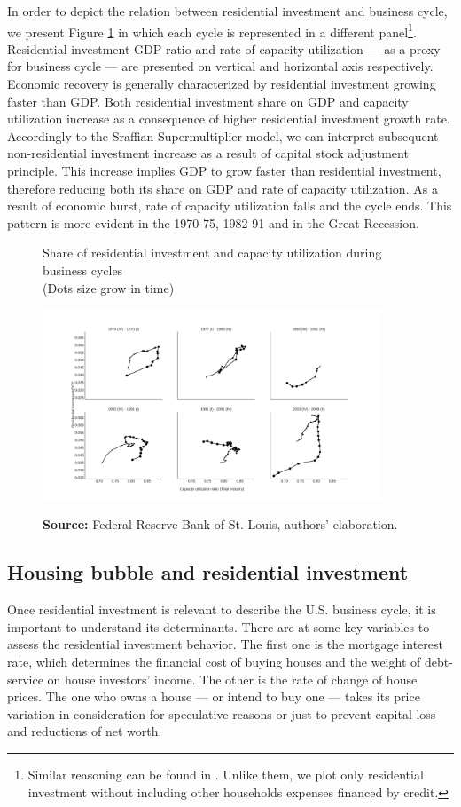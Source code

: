 \documentclass[11pt]{article}
\begin{document}
In order to depict the relation between residential investment and business cycle, we present Figure \ref{fig:cycles} in which each cycle is represented in a different panel\footnote{Similar reasoning can be found in \textcite{fiebiger_trend_2017}. Unlike them, we plot only residential investment without including other households expenses financed by credit.}.
Residential investment-GDP ratio and rate of capacity utilization --- as a proxy for business cycle --- are presented on vertical and horizontal axis respectively.
Economic recovery is generally characterized by residential investment growing faster than GDP. Both residential investment share on GDP and capacity utilization increase as a consequence of higher residential investment growth rate.
Accordingly to the Sraffian Supermultiplier model, we can interpret subsequent non-residential investment increase as a result of capital stock adjustment principle. 
This increase implies GDP to grow faster than residential investment, therefore reducing both its share on GDP and rate of capacity utilization.
As a result of economic burst, rate of capacity utilization falls and the cycle ends.
This pattern is more evident in the 1970-75, 1982-91 and in the Great Recession.


\begin{figure}[htb]
    \centering
        \caption{Share of residential investment and capacity utilization during business cycles\\\centering (Dots size grow in  time)} 
    \includegraphics[width = 0.9\textwidth]{./figs/cycles.png}
    \label{fig:cycles}
    \caption*{\textbf{Source:} Federal Reserve Bank of St. Louis, authors’ elaboration.}
\end{figure}

\subsection{Housing bubble and residential investment}
\label{sec:org8e47bfa}
\label{sec_own}
Once residential investment is relevant to describe the U.S. business cycle, it is important to understand its determinants.
There are at some key variables to assess the residential investment behavior.
The first one is the mortgage interest rate, which determines the financial cost of buying houses and the weight of debt-service on house investors' income.
The other is the rate of change of house prices.
The one who owns a house --- or intend to buy one --- takes its price variation in consideration for speculative reasons or just to prevent capital loss and reductions of net worth.
\end{document}
